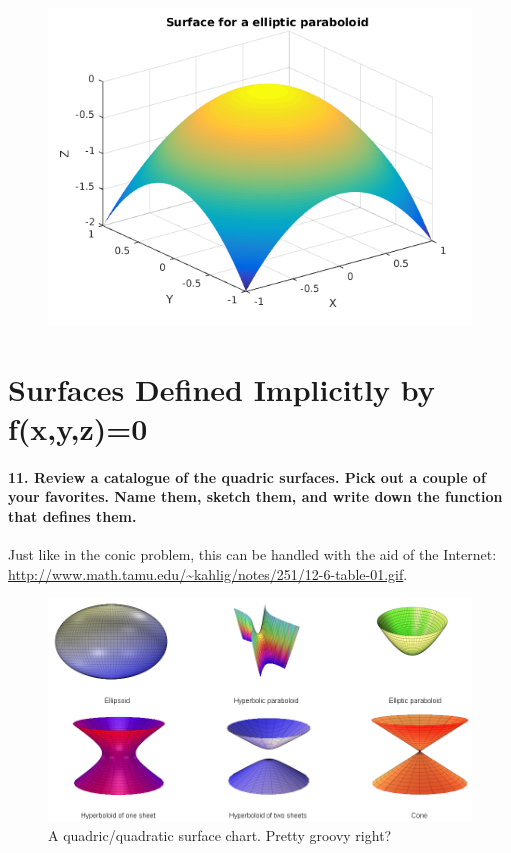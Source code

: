 \documentclass{article}
\begin{document}
\begin{figure} [h!]
\begin{minipage}{0.3\textwidth}
        \end{minipage}\hfill
        \begin{minipage}{0.3\textwidth}
            \centering
            \includegraphics[width=\linewidth]{figs_and_code/elip_parab_3d.png}
        \end{minipage}\hfill
\end{figure}

\section{Surfaces Defined Implicitly by f(x,y,z)=0}

\paragraph{11. Review a catalogue of the quadric surfaces. Pick out a couple of your favorites. Name them, sketch them, and write down the function that defines them.} 

Just like in the conic problem, this can be handled with the aid of the Internet: \url{http://www.math.tamu.edu/~kahlig/notes/251/12-6-table-01.gif}. 

\begin{figure}[h!]
    \centering
    \includegraphics[width=0.65\columnwidth]{figs_and_code/quadric.png}
    \caption{A quadric/quadratic surface chart. Pretty groovy right?}
    
\end{figure}
\end{document}

